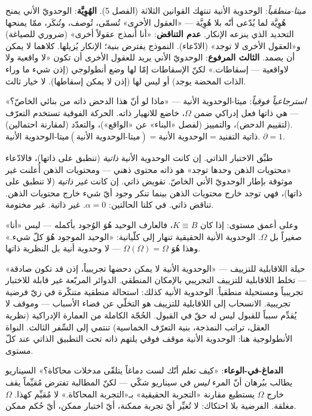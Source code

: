 \documentclass[10pt, openany, oneside]{book}
\begin{document}
\textit{ميتا-منطقياً}: الوحدوية الأنية تنتهك القوانين الثلاثة (الفصل 5). \textbf{الهُوِيَّة}: الوحدويّ الأني يمنح هُوِيَّة لما يُدّعى أنّه بلا هُوِيَّة --- «العقول الأخرى» تُسمّى، تُوصف، وتُنكَر، ممّا يمنحها التحديد الذي ينزعه الإنكار. \textbf{عدم التناقض}: «أنا أُنمذج عقولاً أخرى» (ضروري للصياغة) و«العقول الأخرى لا توجد» (الادّعاء). النموذج يفترض بنية؛ الإنكار يُزيلها. كلاهما لا يمكن أن يصمد. \textbf{الثالث المرفوع}: الوحدويّ الأني يريد للعقول الأخرى أن تكون «لا واقعية ولا لاواقعية --- إسقاطات.» لكنّ الإسقاطات إمّا لها وضع أنطولوجي (إذن شيء ما وراء الذات المحضة يوجد) أو ليس لها (إذن لا يمكن إسقاطها). لا خيار ثالث.

\textit{استرجاعياً فوقياً}: ميتا-الوحدوية الأنية --- «ماذا لو أنّ هذا الدحض ذاته من بنائي الخاصّ؟» --- هي ذاتها فعل إدراكي ضمن $\Omega$، خاضع للانهيار ذاته. الحركة الفوقية تستخدم التعرّف (لتقييم الدحض)، والتمييز (لفصل «البناء» عن «الواقع»)، والتعدّد (لمقارنة احتمالين). $\text{ميتا-الوحدوية الأنية}(\text{ميتا-الوحدوية الأنية}) = \text{الوحدوية الأنية} = \text{ذاتية التفنيد}$. $\partial = 1$.

طبِّق الاختبار الذاتي. إن كانت الوحدوية الأنية \textit{ذاتية} (تنطبق على ذاتها)، فالادّعاء «محتويات الذهن وحدها توجد» هو ذاته محتوى ذهني --- ومحتويات الذهن أُعلنت غير موثوقة بإطار الوحدويّ الأني الخاصّ. تقويض ذاتي. إن كانت \textit{غير ذاتية} (لا تنطبق على ذاتها)، فهي توجد خارج محتويات الذهن بينما تنكر وجود أيّ شيء خارج محتويات الذهن. تناقض ذاتي. في كلتا الحالتين: $\alpha = 0$. غير ذاتية. غير مختومة.

وعلى أعمق مستوى: إذا كان $K \equiv B$، فالعارف الوحيد هُوَ الوُجود بأكمله --- ليس «أنا» صغيراً بل $\Omega$. الوحدوية الأنية الحقيقية تنهار إلى كلّيانية: «الوحيد الموجود هُوَ كلّ شيء.» وهذا هُوَ $\Omega(\Omega) = \Omega$ --- لا وحدوية أنية بل النظرية ذاتها.

حيلة اللاقابلية للتزييف --- «الوحدوية الأنية لا يمكن دحضها تجريبياً، إذن قد تكون صادقة» --- تخلط اللاقابلية للتزييف التجريبي بالإمكان المنطقي. الدوائر المربّعة غير قابلة للاختبار تجريبياً ومستحيلة منطقياً. الوحدوية الأنية كذلك: استحالة منطقية متنكّرة في زيّ فرضية تجريبية. الانسحاب إلى اللاقابلية للتزييف هو التخلّي عن فضاء الأسباب --- وموقف لا يُقدِّم سبباً للقبول ليس له حقّ في القبول. الحُجّة الكاملة من العمارة الإدراكية (نظرية العقل، تراتب النمذجة، بنية التعرّف الخماسية) تنتمي إلى السِّفر الثالث. النواة الأنطولوجية هنا: الوحدوية الأنية موقف فوقي يلتهم ذاته تحت التطبيق الذاتي عند كلّ مستوى.

\textbf{الدماغ-في-الوعاء}: «كيف تعلم أنّك لست دماغاً يتلقّى مدخلات محاكاة؟» السيناريو يطالب ببُرهان أنّ المرء \textit{ليس} في سيناريو شكّي --- لكنّ المطالبة تفترض مُقيِّماً يقف خارج $\Omega$ يستطيع مقارنة «التجربة الحقيقية» بـ«التجربة المحاكاة.» لا مُقيِّم كهذا. $\Omega$ مغلقة. الفرضية بلا احتكاك: لا تُغيِّر أيّ تجربة ممكنة، أيّ اختبار ممكن، أيّ حُكم ممكن.
\end{document}
